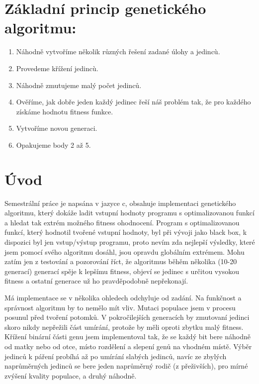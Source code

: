 \documentclass{article}
\begin{document}
\section{Základní princip genetického algoritmu:}
\begin{enumerate}
\item Náhodně vytvoříme několik různých řešení zadané úlohy a jedincù.
\item Provedeme křížení jedincù.
\item Náhodně zmutujeme malý počet jedinců.
\item Ověříme, jak dobře jeden každý jedinec řeší náš problém tak, že pro každého získáme hodnotu fitness funkce.
\item Vytvoříme novou generaci.
\item Opakujeme body 2 až 5. \ 
\end{enumerate}


\section{Úvod}


\setlength{\parindent}{10ex}


Semestrální práce je napsána v jazyce c, obsahuje implementaci genetického algoritmu, který dokáže ladit vstupní hodnoty programu s optimalizovanou funkcí a hledat tak extrém možného fitness ohodnocení. Program s optimalizovanou funkcí, který hodnotil tvořené vstupní hodnoty, byl při vývoji jako black box, k dispozici byl jen vstup/výstup programu, proto nevím zda nejlepší výsledky, které jsem pomocí svého algoritmu dosáhl, jsou opravdu globálním extrémem. Mohu zatím jen z testování a pozorování říct, že algoritmus běhěm několika (10-20 generací) generací spěje k lepšímu fitness, objeví se jedinec s určitou vysokou fitness a ostatní generace už ho pravděpodobně nepřekonají. \par
Má implementace se v několika ohledech odchyluje od zadání. Na funkčnost a správnost algoritmu by to nemělo mít vliv. Mutaci populace jsem v procesu posunul před tvoření potomků. V pokročilejších generacích by zmutovaní jedinci skoro nikdy nepřežili část umírání, protože by měli oproti zbytku malý fitness. Křížení binární části genu jsem implementoval tak, že se každý bit bere náhodně od matky nebo od otce, místo rozdělení a slepení genů na vhodném místě. Výběr jedinců k páření probíhá až po umírání slabých jedinců, navíc ze zbylých naprůměrných jedinců se bere jeden naprůměrný rodič (z přeživších), pro mírné zvýšení kvality populace, a druhý náhodně.
\end{document}
